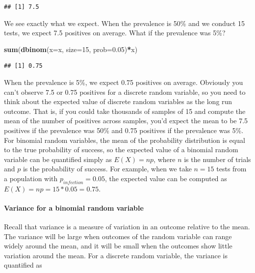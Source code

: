 \documentclass[
]{book}
\newenvironment{Shaded}{\begin{snugshade}}{\end{snugshade}}
\newcommand{\AttributeTok}[1]{\textcolor[rgb]{0.13,0.29,0.53}{#1}}
\newcommand{\DecValTok}[1]{\textcolor[rgb]{0.00,0.00,0.81}{#1}}
\newcommand{\FloatTok}[1]{\textcolor[rgb]{0.00,0.00,0.81}{#1}}
\newcommand{\FunctionTok}[1]{\textcolor[rgb]{0.13,0.29,0.53}{\textbf{#1}}}
\newcommand{\NormalTok}[1]{#1}
\newcommand{\SpecialCharTok}[1]{\textcolor[rgb]{0.81,0.36,0.00}{\textbf{#1}}}
\begin{document}
\begin{verbatim}
## [1] 7.5
\end{verbatim}

We see exactly what we expect. When the prevalence is 50\% and we conduct 15 tests, we expect 7.5 positives on average. What if the prevalence was 5\%?

\begin{Shaded}
\begin{Highlighting}[]
\FunctionTok{sum}\NormalTok{(}\FunctionTok{dbinom}\NormalTok{(}\AttributeTok{x=}\NormalTok{x, }\AttributeTok{size=}\DecValTok{15}\NormalTok{, }\AttributeTok{prob=}\FloatTok{0.05}\NormalTok{)}\SpecialCharTok{*}\NormalTok{x)}
\end{Highlighting}
\end{Shaded}

\begin{verbatim}
## [1] 0.75
\end{verbatim}

When the prevalence is 5\%, we expect 0.75 positives on average. Obviously you can't observe 7.5 or 0.75 positives for a discrete random variable, so you need to think about the expected value of discrete random variables as the long run outcome. That is, if you could take thousands of samples of 15 and compute the mean of the number of positives across samples, you'd expect the mean to be 7.5 positives if the prevalence was 50\% and 0.75 positives if the prevalence was 5\%.
For binomial random variables, the mean of the probability distribution is equal to the true probability of success, so the expected value of a binomial random variable can be quantified simply as \(E(X) = np\), where \(n\) is the number of trials and \(p\) is the probability of success. For example, when we take \(n = 15\) tests from a population with \(p_{infection} = 0.05\), the expected value can be computed as \(E(X) = np=15*0.05=0.75\).

\paragraph{Variance for a binomial random variable}\label{variance-for-a-binomial-random-variable}

Recall that variance is a measure of variation in an outcome relative to the mean. The variance will be large when outcomes of the random variable can range widely around the mean, and it will be small when the outcomes show little variation around the mean. For a discrete random variable, the variance is quantified as
\end{document}
